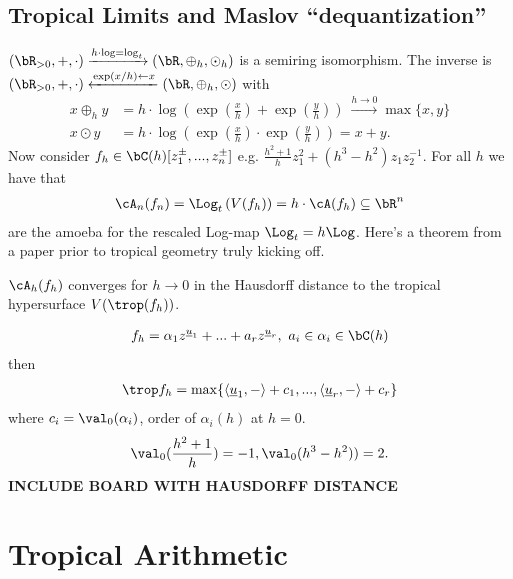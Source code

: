 \subsection{Tropical Limits and Maslov ``dequantization''}
$(\bR_{>0}, +, \cdot)\xrightarrow{h\cdot \log = \log_t} (\bR,\oplus_h, \odot_h)$ is a semiring isomorphism. The inverse is $(\bR_{>0},+,\cdot)\xleftarrow{\exp(x/h)\leftarrow x} (\bR,\oplus_h,\odot)$ with
\begin{align*}
  x \oplus_h y &= h\cdot \log\left(\exp\left(\frac{x}{h}\right) + \exp\left(\frac{y}{h}\right)\right) ~ \xrightarrow{h \to 0} \max\{x,y\} \\
  x \odot y &= h\cdot \log\left(\exp\left(\frac{x}{h}\right)\cdot \exp\left(\frac{y}{h}\right)\right) = x + y.
\end{align*}
Now consider $f_h \in \bC(h)[z_1^{\pm}, ..., z_n^{\pm}]$ e.g. $\frac{h^2 + 1}{h}z_1^2 + (h^3 - h^2)z_1z_2^{-1}$. For all $h$ we have that 
\begin{align*}
  \cA_n(f_n) = \Log_t\left(V(f_h)\right) = h\cdot \cA(f_h) \subseteq \bR^n
\end{align*}
are the amoeba for the rescaled Log-map $\Log_t = h\Log$.
Here's a theorem from a paper prior to tropical geometry truly kicking off.
\begin{thm}\label{thm}
  $\cA_h(f_h)$ converges for $h \to 0$ in the Hausdorff distance to the tropical hypersurface $V(\trop(f_h))$.
\end{thm}
\begin{align*}
  f_h = \alpha_1z^{\underline{u}_1} + ... + a_r z^{\underline{u}_r}, ~ a_i \in \alpha_i \in \bC(h)
\end{align*}
then
\begin{align*}
  \trop f_h = \max \{\langle \underline{u}_1, - \rangle + c_1, ..., \langle \underline{u}_r, - \rangle + c_r\}
\end{align*}
where $c_i = \val_0(\alpha_i)$, order of $\alpha_i(h)$ at $h = 0$.
\begin{align*}
  \val_0(\frac{h^2 + 1}{h}) = -1, \val_0(h^3 - h^2)) = 2.
\end{align*}
\textbf{INCLUDE BOARD WITH HAUSDORFF DISTANCE}

\section{Tropical Arithmetic}

